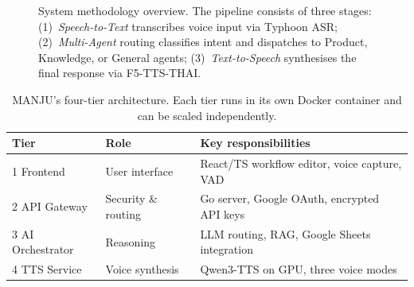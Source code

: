 \documentclass[10pt, a4paper, twocolumn]{article}
\begin{document}
\begin{figure}[t]
    \caption{System methodology overview. The pipeline consists of three stages:
    (1)~\textit{Speech-to-Text} transcribes voice input via Typhoon ASR;
    (2)~\textit{Multi-Agent} routing classifies intent and dispatches to
    Product, Knowledge, or General agents;
    (3)~\textit{Text-to-Speech} synthesises the final response via F5-TTS-THAI.}
    \label{fig:methodology}
\end{figure}

\begin{table}[h]
    \centering
    \caption{MANJU's four-tier architecture. Each tier runs in its own
             Docker container and can be scaled independently.}
    \label{tab:tiers}
    \small
    \begin{tabular}{@{}lll@{}}
        \toprule
        \textbf{Tier} & \textbf{Role} & \textbf{Key responsibilities} \\
        \midrule
        1 Frontend      & User interface     & React/TS workflow editor, voice capture, VAD \\
        2 API Gateway   & Security \& routing & Go server, Google OAuth, encrypted API keys \\
        3 AI Orchestrator & Reasoning        & LLM routing, RAG, Google Sheets integration \\
        4 TTS Service   & Voice synthesis    & Qwen3-TTS on GPU, three voice modes \\
        \bottomrule
    \end{tabular}
\end{table}
\end{document}
